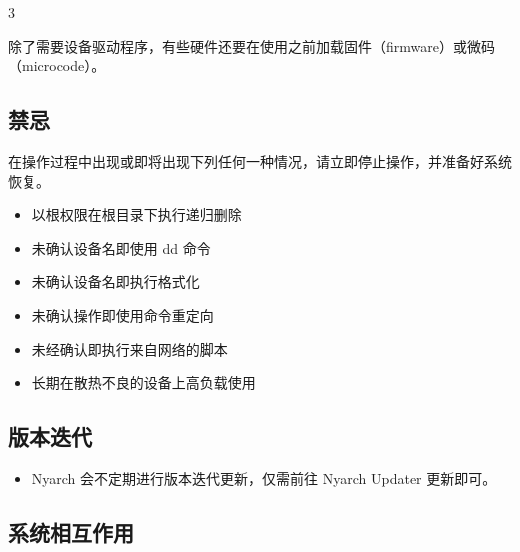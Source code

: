 \documentclass{article}
\begin{document}
\begin{multicols*}{3}
\begin{itemize}[leftmargin=*]
		除了需要设备驱动程序，有些硬件还要在使用之前加载固件（firmware）或微码（microcode）。

	\end{itemize}


	\begin{tcolorbox}
	\section*{禁忌}
	\end{tcolorbox}

	在操作过程中出现或即将出现下列任何一种情况，请立即停止操作，并准备好系统恢复。

	\begin{itemize}[leftmargin=*]
		\setlength{\itemsep}{0pt}
		\setlength{\parskip}{0pt}
		\setlength{\parsep}{0pt}

		\item 以根权限在根目录下执行递归删除
		\item 未确认设备名即使用 dd 命令
		\item 未确认设备名即执行格式化
		\item 未确认操作即使用命令重定向
		\item 未经确认即执行来自网络的脚本
		\item 长期在散热不良的设备上高负载使用
	\end{itemize}


	 \begin{tcolorbox}
	 \section*{版本迭代}
	 \end{tcolorbox}
	 	\begin{itemize}[leftmargin=*]
		\setlength{\itemsep}{0pt}
		\setlength{\parskip}{0pt}
		\setlength{\parsep}{0pt}

		\item Nyarch 会不定期进行版本迭代更新，仅需前往 Nyarch Updater 更新即可。

	\end{itemize}


	\begin{tcolorbox}
	\section*{系统相互作用}
	\end{tcolorbox}
	\begin{itemize}[leftmargin=*]
		\setlength{\parindent}{0pt}


\end{itemize}
\end{multicols*}
\end{document}
